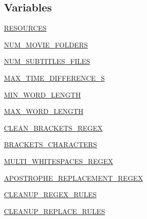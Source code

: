 \subsection*{Variables}
\begin{DoxyCompactItemize}
\item 
\hyperlink{namespaceparlai_1_1tasks_1_1opensubtitles_1_1build__2018_a50834457c930da8ab48f04b3d8714c44}{R\+E\+S\+O\+U\+R\+C\+ES}
\item 
\hyperlink{namespaceparlai_1_1tasks_1_1opensubtitles_1_1build__2018_a4064cdac9a1bb68b7ad91ce505ffc880}{N\+U\+M\+\_\+\+M\+O\+V\+I\+E\+\_\+\+F\+O\+L\+D\+E\+RS}
\item 
\hyperlink{namespaceparlai_1_1tasks_1_1opensubtitles_1_1build__2018_a4a60deac50983a7e7c563eb7f9cf4a13}{N\+U\+M\+\_\+\+S\+U\+B\+T\+I\+T\+L\+E\+S\+\_\+\+F\+I\+L\+ES}
\item 
\hyperlink{namespaceparlai_1_1tasks_1_1opensubtitles_1_1build__2018_a7759d70d3602a5eb39d02232fb2a90dd}{M\+A\+X\+\_\+\+T\+I\+M\+E\+\_\+\+D\+I\+F\+F\+E\+R\+E\+N\+C\+E\+\_\+S}
\item 
\hyperlink{namespaceparlai_1_1tasks_1_1opensubtitles_1_1build__2018_a85a2759dc8c6e9a00879b1ec6dca6fae}{M\+I\+N\+\_\+\+W\+O\+R\+D\+\_\+\+L\+E\+N\+G\+TH}
\item 
\hyperlink{namespaceparlai_1_1tasks_1_1opensubtitles_1_1build__2018_adf363645fe71bbaa48f08f659ed90bcb}{M\+A\+X\+\_\+\+W\+O\+R\+D\+\_\+\+L\+E\+N\+G\+TH}
\item 
\hyperlink{namespaceparlai_1_1tasks_1_1opensubtitles_1_1build__2018_aa6c0d72c5f5b4f7959fa467bf88ad85c}{C\+L\+E\+A\+N\+\_\+\+B\+R\+A\+C\+K\+E\+T\+S\+\_\+\+R\+E\+G\+EX}
\item 
\hyperlink{namespaceparlai_1_1tasks_1_1opensubtitles_1_1build__2018_a93ce9ab977245a9c031341ace0c14905}{B\+R\+A\+C\+K\+E\+T\+S\+\_\+\+C\+H\+A\+R\+A\+C\+T\+E\+RS}
\item 
\hyperlink{namespaceparlai_1_1tasks_1_1opensubtitles_1_1build__2018_a5c1b6cbec3209a9a71111847ff7244f4}{M\+U\+L\+T\+I\+\_\+\+W\+H\+I\+T\+E\+S\+P\+A\+C\+E\+S\+\_\+\+R\+E\+G\+EX}
\item 
\hyperlink{namespaceparlai_1_1tasks_1_1opensubtitles_1_1build__2018_a2585527b7bffd95ec9d874f5dd3e8326}{A\+P\+O\+S\+T\+R\+O\+P\+H\+E\+\_\+\+R\+E\+P\+L\+A\+C\+E\+M\+E\+N\+T\+\_\+\+R\+E\+G\+EX}
\item 
\hyperlink{namespaceparlai_1_1tasks_1_1opensubtitles_1_1build__2018_ada494d52f1f479a2ec92022fec1cf298}{C\+L\+E\+A\+N\+U\+P\+\_\+\+R\+E\+G\+E\+X\+\_\+\+R\+U\+L\+ES}
\item 
\hyperlink{namespaceparlai_1_1tasks_1_1opensubtitles_1_1build__2018_a775b1aaa8a41b1e2b37ee72ae9bc7f26}{C\+L\+E\+A\+N\+U\+P\+\_\+\+R\+E\+P\+L\+A\+C\+E\+\_\+\+R\+U\+L\+ES}
\end{DoxyCompactItemize}


